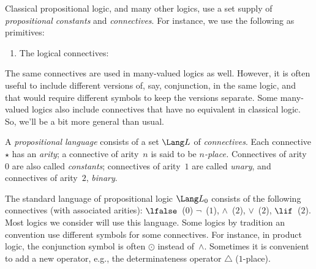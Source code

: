\documentclass[../../../include/open-logic-section]{subfiles}
\begin{document}

Classical propositional logic, and many other logics, use a set supply
of \emph{propositional constants} and \emph{connectives}. For
instance, we use the following as primitives:
\begin{enumerate}
\item The logical connectives:
  \startycommalist
\end{enumerate}

The same connectives are used in many-valued logics as well. However,
it is often useful to include different versions of, say, conjunction,
in the same logic, and that would require different symbols to keep
the versions separate. Some many-valued logics also include
connectives that have no equivalent in classical logic. So, we'll be a
bit more general than usual.

\begin{defn}
  A \emph{propositional language} consists of a set $\Lang L$ of
  \emph{connectives}. Each connective $\star$ has an \emph{arity}; a
  connective of arity~$n$ is said to be \emph{$n$-place.}
  Connectives of arity~$0$ are also called \emph{constants};
  connectives of arity~$1$ are called \emph{unary}, and connectives of
  arity~$2$, \emph{binary}.
\end{defn}

\begin{ex}
  The standard language of propositional logic $\Lang L_0$ consists of
  the following connectives (with associated arities): 
  $\lfalse$~($0$)
  $\lnot$~($1$),
  $\land$~($2$),
  $\lor$~($2$),
  $\lif$~($2$). Most logics we consider will use this language. Some
  logics by tradition an convention use different symbols for some
  connectives. For instance, in product logic, the conjunction symbol
  is often $\odot$ instead of~$\land$. Sometimes it is convenient to
  add a new operator, e.g., the determinateness operator $\triangle$
  ($1$-place).
\end{ex}
\end{document}
